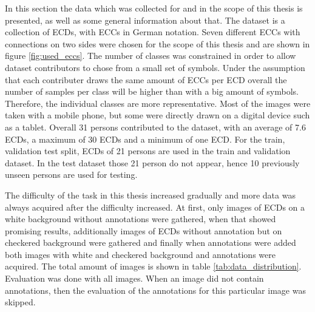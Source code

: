 \label{sec:data}

In this section the data which was collected for and in the scope of this thesis is presented, as well as some general information about that.
The dataset is a collection of \acp{ECD}, with \acp{ECC} in German notation.
Seven different \acp{ECC} with connections on two sides were chosen for the scope of this thesis and are shown in figure \ref{fig:used_eccs}.
The number of classes was constrained in order to allow dataset contributors to chose from a small set of symbols.
Under the assumption that each contributer draws the same amount of \acp{ECC} per \ac{ECD} overall the number of samples per class will be higher than with a big amount of symbols.
Therefore, the individual classes are more representative.
Most of the images were taken with a mobile phone, but some were directly drawn on a digital device such as a tablet.
Overall 31 persons contributed to the dataset, with an average of 7.6 \acp{ECD}, a maximum of 30 \acp{ECD} and a minimum of one \ac{ECD}.
For the train, validation test split, \acp{ECD} of 21 persons are used in the train and validation dataset.
In the test dataset those 21 person do not appear, hence 10 previously unseen persons are used for testing.

The difficulty of the task in this thesis increased gradually and more data was always acquired after the difficulty increased.
At first, only images of \acp{ECD} on a white background without annotations were gathered, when that showed promising results, additionally images of \acp{ECD} without annotation but on checkered background were gathered and finally when annotations were added both images with white and checkered background and annotations were acquired.
The total amount of images is shown in table \ref{tab:data_distribution}.
Evaluation was done with all images.
When an image did not contain annotations, then the evaluation of the annotations for this particular image was skipped.


